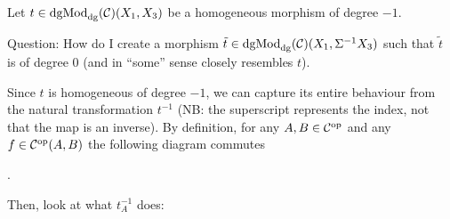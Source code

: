 \begin{question}
    Let \( t \in \operatorname{dgMod}_{\operatorname{dg}}({\mathcal{C}})(X_1, X_3) \) be a homogeneous morphism of degree \( -1 \).

    Question: How do I create a morphism \( \tilde{t} \in \operatorname{dgMod}_{\operatorname{dg}}({\mathcal{C}})(X_1, \Sigma^{-1} X_3) \) such that \( \tilde{t} \) is of degree \( 0 \) (and in ``some'' sense closely resembles \( t \)).

    Since \( t \) is homogeneous of degree \( -1 \), we can capture its entire behaviour from the natural transformation \( t^{-1} \) (NB: the superscript represents the index, not that the map is an inverse). By definition, for any \( A, B \in {\mathcal{C}}^{\operatorname{op}} \) and any \( f \in {\mathcal{C}}^{\operatorname{op}}(A, B) \) the following diagram commutes
    \begin{center}
        .
    \end{center}

    Then, look at what \( t^{-1}_A \) does:
    \begin{center}
\end{center}
\end{question}
